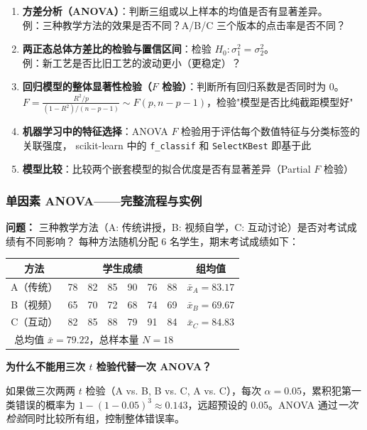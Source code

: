 \begin{enumerate}[label=(\arabic*)]
    \item \textbf{方差分析（ANOVA）}：判断三组或以上样本的均值是否有显著差异。\\
    例：三种教学方法的效果是否不同？A/B/C 三个版本的点击率是否不同？
    \item \textbf{两正态总体方差比的检验与置信区间}：检验 $H_0: \sigma_1^2 = \sigma_2^2$。\\
    例：新工艺是否比旧工艺的波动更小（更稳定）？
    \item \textbf{回归模型的整体显著性检验（$F$ 检验）}：判断所有回归系数是否同时为 0。\\
    $F = \frac{R^2 / p}{(1-R^2)/(n-p-1)} \sim F(p, n-p-1)$，检验"模型是否比纯截距模型好"
    \item \textbf{机器学习中的特征选择}：ANOVA $F$ 检验用于评估每个数值特征与分类标签的关联强度，
    scikit-learn 中的 \verb|f_classif| 和 \verb|SelectKBest| 即基于此
    \item \textbf{模型比较}：比较两个嵌套模型的拟合优度是否有显著差异（Partial $F$ 检验）
\end{enumerate}

\subsubsection{单因素 ANOVA——完整流程与实例}

\textbf{问题：} 三种教学方法（A: 传统讲授，B: 视频自学，C: 互动讨论）是否对考试成绩有不同影响？
每种方法随机分配 6 名学生，期末考试成绩如下：

\begin{center}
\begin{tabular}{c|cccccc|c}
\toprule
\textbf{方法} & \multicolumn{6}{c|}{\textbf{学生成绩}} & \textbf{组均值} \\
\midrule
A（传统） & 78 & 82 & 85 & 90 & 76 & 88 & $\bar{x}_A = 83.17$ \\
B（视频） & 65 & 70 & 72 & 68 & 74 & 69 & $\bar{x}_B = 69.67$ \\
C（互动） & 82 & 85 & 88 & 79 & 91 & 84 & $\bar{x}_C = 84.83$ \\
\midrule
\multicolumn{7}{c}{总均值 $\bar{x} = 79.22$，总样本量 $N = 18$} \\
\bottomrule
\end{tabular}
\end{center}

\textbf{为什么不能用三次 $t$ 检验代替一次 ANOVA？}

如果做三次两两 $t$ 检验（A vs. B, B vs. C, A vs. C），每次 $\alpha = 0.05$，累积犯第一类错误的概率为
$1 - (1-0.05)^3 \approx 0.143$，远超预设的 0.05。ANOVA 通过\emph{一次检验}同时比较所有组，控制整体错误率。

